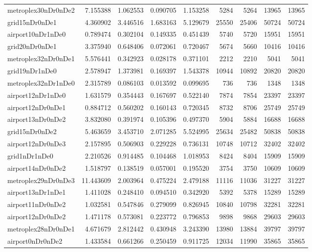 \begin{longtable}{|l|r|r|r|r|r|r|r|r|}
metroplex30nDr0nDe2 & 7.155388 & 1.062553 & 0.090705 & 1.153258 & 5284 & 5264 & 13965 & 13965 \\
grid15nDr0nDe1 & 4.360902 & 3.446516 & 1.683163 & 5.129679 & 25550 & 25406 & 50724 & 50724 \\
airport10nDr1nDe0 & 0.789474 & 0.302104 & 0.149335 & 0.451439 & 5740 & 5720 & 15951 & 15951 \\
grid20nDr0nDe1 & 3.375940 & 0.648406 & 0.072061 & 0.720467 & 5674 & 5660 & 10416 & 10416 \\
metroplex32nDr0nDe1 & 5.576441 & 0.342923 & 0.028178 & 0.371101 & 2212 & 2210 & 5041 & 5041 \\
grid19nDr1nDe0 & 2.578947 & 1.373981 & 0.169397 & 1.543378 & 10944 & 10892 & 20820 & 20820 \\
metroplex32nDr1nDe0 & 2.315789 & 0.086103 & 0.013592 & 0.099695 & 736 & 736 & 1348 & 1348 \\
airport12nDr1nDe0 & 1.631579 & 0.354443 & 0.167697 & 0.522140 & 7874 & 7854 & 23397 & 23397 \\
airport12nDr0nDe1 & 0.884712 & 0.560202 & 0.160143 & 0.720345 & 8732 & 8706 & 25749 & 25749 \\
airport13nDr0nDe2 & 3.832080 & 0.391974 & 0.105396 & 0.497370 & 5904 & 5884 & 16688 & 16688 \\
grid15nDr0nDe2 & 5.463659 & 3.453710 & 2.071285 & 5.524995 & 25634 & 25482 & 50838 & 50838 \\
airport12nDr0nDe3 & 2.157895 & 0.506903 & 0.229228 & 0.736131 & 10748 & 10712 & 32402 & 32402 \\
grid1nDr1nDe0 & 2.210526 & 0.914485 & 0.104468 & 1.018953 & 8424 & 8404 & 15909 & 15909 \\
airport14nDr0nDe2 & 1.518797 & 0.138519 & 0.057001 & 0.195520 & 3754 & 3750 & 10609 & 10609 \\
metroplex29nDr0nDe3 & 11.443609 & 2.003964 & 0.475224 & 2.479188 & 11116 & 11036 & 31227 & 31227 \\
airport13nDr1nDe1 & 1.411028 & 0.248410 & 0.094510 & 0.342920 & 5392 & 5378 & 15289 & 15289 \\
airport11nDr0nDe2 & 1.032581 & 0.547846 & 0.279099 & 0.826945 & 10840 & 10798 & 32281 & 32281 \\
airport12nDr0nDe2 & 1.471178 & 0.573081 & 0.223772 & 0.796853 & 9898 & 9868 & 29603 & 29603 \\
metroplex28nDr0nDe1 & 4.671679 & 2.812442 & 0.430948 & 3.243390 & 13980 & 13884 & 39797 & 39797 \\
airport0nDr0nDe2 & 1.433584 & 0.661266 & 0.250459 & 0.911725 & 12034 & 11990 & 35865 & 35865 \\

\end{longtable}
